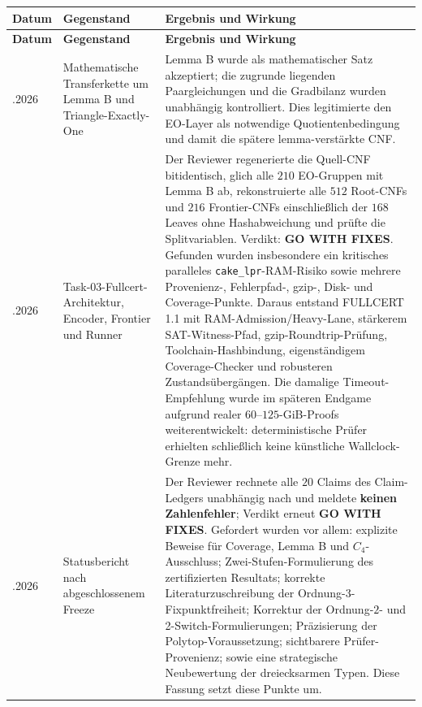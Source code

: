 \documentclass[11pt,a4paper]{article}
\newcommand{\code}[1]{\texttt{#1}}
\begin{document}
\begin{longtable}{>{\raggedright\arraybackslash}p{20mm} >{\raggedright\arraybackslash}p{38mm} >{\raggedright\arraybackslash}p{85mm}}
\toprule
\textbf{Datum} & \textbf{Gegenstand} & \textbf{Ergebnis und Wirkung}\\
\midrule
\endfirsthead
\toprule
\textbf{Datum} & \textbf{Gegenstand} & \textbf{Ergebnis und Wirkung}\\
\midrule
\endhead
28.08.2026 &
Mathematische Transferkette um Lemma B und Triangle-Exactly-One &
Lemma B wurde als mathematischer Satz akzeptiert; die zugrunde liegenden Paargleichungen und die Gradbilanz wurden unabhängig kontrolliert. Dies legitimierte den EO-Layer als notwendige Quotientenbedingung und damit die spätere lemma-verstärkte CNF.\\[1mm]

29.08.2026 &
Task-03-Fullcert-Architektur, Encoder, Frontier und Runner &
Der Reviewer regenerierte die Quell-CNF bitidentisch, glich alle $210$ EO-Gruppen mit Lemma B ab, rekonstruierte alle $512$ Root-CNFs und $216$ Frontier-CNFs einschließlich der $168$ Leaves ohne Hashabweichung und prüfte die Splitvariablen. Verdikt: \textbf{GO WITH FIXES}. Gefunden wurden insbesondere ein kritisches paralleles \code{cake\_lpr}-RAM-Risiko sowie mehrere Provenienz-, Fehlerpfad-, gzip-, Disk- und Coverage-Punkte. Daraus entstand FULLCERT 1.1 mit RAM-Admission/Heavy-Lane, stärkerem SAT-Witness-Pfad, gzip-Roundtrip-Prüfung, Toolchain-Hashbindung, eigenständigem Coverage-Checker und robusteren Zustandsübergängen. Die damalige Timeout-Empfehlung wurde im späteren Endgame aufgrund realer $60$--$125$-GiB-Proofs weiterentwickelt: deterministische Prüfer erhielten schließlich keine künstliche Wallclock-Grenze mehr.\\[1mm]

03.09.2026 &
Statusbericht nach abgeschlossenem Freeze &
Der Reviewer rechnete alle $20$ Claims des Claim-Ledgers unabhängig nach und meldete \textbf{keinen Zahlenfehler}; Verdikt erneut \textbf{GO WITH FIXES}. Gefordert wurden vor allem: explizite Beweise für Coverage, Lemma B und $C_4$-Ausschluss; Zwei-Stufen-Formulierung des zertifizierten Resultats; korrekte Literaturzuschreibung der Ordnung-$3$-Fixpunktfreiheit; Korrektur der Ordnung-$2$- und 2-Switch-Formulierungen; Präzisierung der Polytop-Voraussetzung; sichtbarere Prüfer-Provenienz; sowie eine strategische Neubewertung der dreiecksarmen Typen. Diese Fassung setzt diese Punkte um.\\
\bottomrule
\end{longtable}
\end{document}
